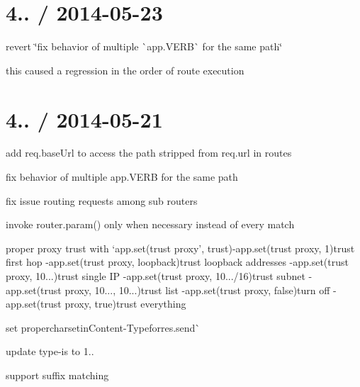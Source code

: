 {\ttfamily \section*{4.. / 2014-\/05-\/23 }}

{\ttfamily }

{\ttfamily 
\begin{DoxyItemize}
\item revert \char`\"{}fix behavior of multiple \`{}app.\+V\+E\+R\+B\`{} for the same path\char`\"{}
\begin{DoxyItemize}
\item this caused a regression in the order of route execution
\end{DoxyItemize}
\end{DoxyItemize}}

{\ttfamily \section*{4.. / 2014-\/05-\/21 }}

{\ttfamily }

{\ttfamily 
\begin{DoxyItemize}
\item add {\ttfamily req.\+base\+Url} to access the path stripped from {\ttfamily req.\+url} in routes
\item fix behavior of multiple {\ttfamily app.\+V\+E\+RB} for the same path
\item fix issue routing requests among sub routers
\item invoke {\ttfamily router.\+param()} only when necessary instead of every match
\item proper proxy trust with `app.\+set(\textquotesingle{}trust proxy', trust){\ttfamily  -\/}app.\+set(\textquotesingle{}trust proxy\textquotesingle{}, 1){\ttfamily trust first hop -\/}app.\+set(\textquotesingle{}trust proxy\textquotesingle{}, \textquotesingle{}loopback\textquotesingle{}){\ttfamily trust loopback addresses -\/}app.\+set(\textquotesingle{}trust proxy\textquotesingle{}, \textquotesingle{}10...\textquotesingle{}){\ttfamily trust single IP -\/}app.\+set(\textquotesingle{}trust proxy\textquotesingle{}, \textquotesingle{}10.../16\textquotesingle{}){\ttfamily trust subnet -\/}app.\+set(\textquotesingle{}trust proxy\textquotesingle{}, \textquotesingle{}10..., 10...\textquotesingle{}){\ttfamily trust list -\/}app.\+set(\textquotesingle{}trust proxy\textquotesingle{}, false){\ttfamily turn off -\/}app.\+set(\textquotesingle{}trust proxy\textquotesingle{}, true){\ttfamily trust everything}
\item {\ttfamily set proper}charset{\ttfamily in}Content-\/\+Type{\ttfamily for}res.\+send\`{}
\item update type-\/is to 1..
\begin{DoxyItemize}
\item support suffix matching
\end{DoxyItemize}
\end{DoxyItemize}}

